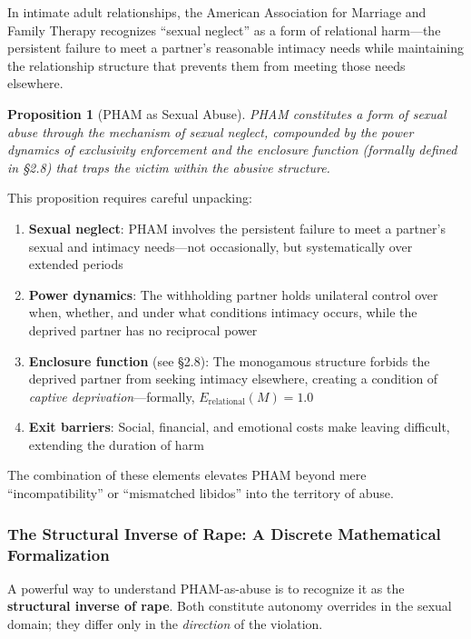 \documentclass[12pt, letterpaper]{article}
\newtheorem{proposition}{Proposition}[section]
\begin{document}
In intimate adult relationships, the American Association for Marriage and Family Therapy recognizes ``sexual neglect'' as a form of relational harm---the persistent failure to meet a partner's reasonable intimacy needs while maintaining the relationship structure that prevents them from meeting those needs elsewhere.

\begin{proposition}[PHAM as Sexual Abuse]
PHAM constitutes a form of sexual abuse through the mechanism of sexual neglect, compounded by the power dynamics of exclusivity enforcement and the enclosure function (formally defined in \S 2.8) that traps the victim within the abusive structure.
\end{proposition}

This proposition requires careful unpacking:

\begin{enumerate}
    \item \textbf{Sexual neglect}: PHAM involves the persistent failure to meet a partner's sexual and intimacy needs---not occasionally, but systematically over extended periods
    
    \item \textbf{Power dynamics}: The withholding partner holds unilateral control over when, whether, and under what conditions intimacy occurs, while the deprived partner has no reciprocal power
    
    \item \textbf{Enclosure function} (see \S 2.8): The monogamous structure forbids the deprived partner from seeking intimacy elsewhere, creating a condition of \textit{captive deprivation}---formally, $E_{\text{relational}}(M) = 1.0$
    
    \item \textbf{Exit barriers}: Social, financial, and emotional costs make leaving difficult, extending the duration of harm
\end{enumerate}

The combination of these elements elevates PHAM beyond mere ``incompatibility'' or ``mismatched libidos'' into the territory of abuse.

\subsubsection{The Structural Inverse of Rape: A Discrete Mathematical Formalization}

A powerful way to understand PHAM-as-abuse is to recognize it as the \textbf{structural inverse of rape}. Both constitute autonomy overrides in the sexual domain; they differ only in the \textit{direction} of the violation.
\end{document}
